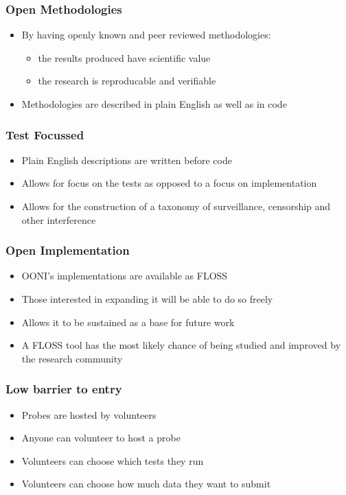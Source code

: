 \documentclass{beamer}
\begin{document}
\begin{frame}
	\frametitle{Open Methodologies}
	\begin{itemize}
		\item{By having openly known and peer reviewed methodologies:}
		\begin{itemize}
			\item{the results produced have scientific value}
			\item{the research is reproducable and verifiable}
		\end{itemize}
		\item{Methodologies are described in plain English as well as in code}
	\end{itemize}
\end{frame}

\begin{frame}
	\frametitle{Test Focussed}
	\begin{itemize}
		\item{Plain English descriptions are written before code}
		\item{Allows for focus on the tests as opposed to a focus on implementation}
		\item{Allows for the construction of a taxonomy of surveillance, censorship and other interference}
	\end{itemize}
\end{frame}

\begin{frame}
	\frametitle{Open Implementation}
	\begin{itemize}
		\item{OONI's implementations are available as FLOSS}
		\item{Those interested in expanding it will be able to do so freely}
		\item{Allows it to be sustained as a base for future work}
		\item{A FLOSS tool has the most likely chance of being studied and improved by the research community}
	\end{itemize}
\end{frame}

\begin{frame}
	\frametitle{Low barrier to entry}
	\begin{itemize}
		\item{Probes are hosted by volunteers}
		\item{Anyone can volunteer to host a probe}
		\item{Volunteers can choose which tests they run}
		\item{Volunteers can choose how much data they want to submit}
	\end{itemize}
\end{frame}
\end{document}
